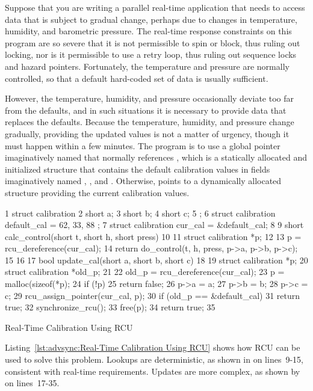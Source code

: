 Suppose that you are writing a parallel real-time application that needs
to access
data that is subject to gradual change, perhaps due to changes in
temperature, humidity, and barometric pressure.
The real-time response constraints on this program are so severe that
it is not permissible to spin or block, thus ruling out locking,
nor is it permissible to use a retry loop, thus ruling out sequence locks
and hazard pointers.
Fortunately, the temperature and pressure are normally controlled,
so that a default hard-coded set of data is usually sufficient.

However, the temperature, humidity, and pressure occasionally deviate too far
from the defaults, and in such situations it is necessary to provide
data that replaces the defaults.
Because the temperature, humidity, and pressure change gradually,
providing the updated values is not a matter of urgency, though
it must happen within a few minutes.
The program is to use a global pointer imaginatively named 
that normally references , which is a statically allocated
and initialized structure that contains the default calibration values
in fields imaginatively named , , and .
Otherwise,  points to a dynamically allocated
structure providing the current calibration values.

\begin{listing}[tb]
{ \scriptsize
\begin{verbbox}
 1 struct calibration {
 2   short a;
 3   short b;
 4   short c;
 5 };
 6 struct calibration default_cal = { 62, 33, 88 };
 7 struct calibration cur_cal = &default_cal;
 8
 9 short calc_control(short t, short h, short press)
10 {
11   struct calibration *p;
12
13   p = rcu_dereference(cur_cal);
14   return do_control(t, h, press, p->a, p->b, p->c);
15 }
16
17 bool update_cal(short a, short b, short c)
18 {
19   struct calibration *p;
20   struct calibration *old_p;
21
22   old_p = rcu_dereference(cur_cal);
23   p = malloc(sizeof(*p);
24   if (!p)
25     return false;
26   p->a = a;
27   p->b = b;
28   p->c = c;
29   rcu_assign_pointer(cur_cal, p);
30   if (old_p == &default_cal)
31     return true;
32   synchronize_rcu();
33   free(p);
34   return true;
35 }
\end{verbbox}
}
\centering
\theverbbox
\caption{Real-Time Calibration Using RCU}
\label{lst:advsync:Real-Time Calibration Using RCU}
\end{listing}

Listing~\ref{lst:advsync:Real-Time Calibration Using RCU}
shows how RCU can be used to solve this problem.
Lookups are deterministic, as shown in 
on lines~9-15, consistent with real-time requirements.
Updates are more complex, as shown by 
on lines~17-35.

